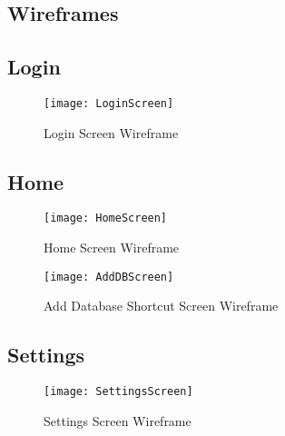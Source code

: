 \documentclass[
10pt, %
a4paper, %
oneside, %
headinclude,footinclude, %
BCOR5mm, %
]{scrartcl}
\begin{document}
\begin{appendices}

\section{Wireframes} %
\label{sec:wireframes}

\subsection{Login} %
\label{sub:login}

\begin{figure}[htb]
\centering 
\texttt{[image: LoginScreen]} 
\caption{Login Screen Wireframe} %
\label{wire:login} 
\end{figure}


\subsection{Home} %
\label{sub:home}

\begin{figure}[htb]
\centering 
\texttt{[image: HomeScreen]} 
\caption{Home Screen Wireframe}
\label{wire:home} 
\end{figure}

\begin{figure}[htb]
\centering 
\texttt{[image: AddDBScreen]} 
\caption{Add Database Shortcut Screen Wireframe} 
\label{wire:add_db} 
\end{figure}


\newpage

\subsection{Settings} %
\label{sub:settings}

\begin{figure}[htb]
\centering 
\texttt{[image: SettingsScreen]} 
\caption{Settings Screen Wireframe} 
\label{wire:settings} 
\end{figure}


\newpage


\end{appendices}
\end{document}
